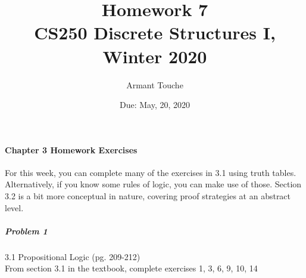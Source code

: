 \documentclass[11pt,a4paper]{article}
\title{\bf Homework 7\\[1ex]
\rm\normalsize CS250 Discrete Structures I, Winter 2020 }
\date{\normalsize Due: May, 20, 2020}
\author{\normalsize Armant Touche}
\begin{document}
 
\vspace{0cm}\maketitle 

	\paragraph{Chapter 3 Homework Exercises} For this week, you can complete many of the exercises in 3.1 using truth tables. Alternatively, if you know some rules of logic, you can make use of those. Section 3.2 is a bit more conceptual in nature, covering proof strategies at an abstract level.
	
	\subparagraph{Problem 1} 3.1 Propositional Logic (pg. 209-212) \\
			
		From section 3.1 in the textbook, complete exercises 1, 3, 6, 9, 10, 14
\end{document}

